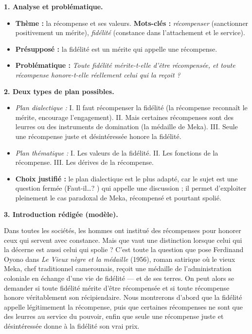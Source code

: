 \documentclass[11pt]{article}
\newcommand{\cle}[1]{{\popxbold\color{popdark}#1}}
\begin{document}
\begin{corrige}
\textbf{1. Analyse et problématique.}
\begin{itemize}
\item \textbf{Thème :} la récompense et ses valeurs. \textbf{Mots-clés :} \emph{récompenser} (sanctionner positivement un mérite), \emph{fidélité} (constance dans l'attachement et le service).
\item \textbf{Présupposé :} la fidélité est un mérite qui appelle une récompense.
\item \textbf{Problématique :} \emph{Toute fidélité mérite-t-elle d'être récompensée, et toute récompense honore-t-elle réellement celui qui la reçoit ?}
\end{itemize}

\textbf{2. Deux types de plan possibles.}
\begin{itemize}
\item \emph{Plan dialectique :} I. Il faut récompenser la fidélité (la récompense reconnaît le mérite, encourage l'engagement). II. Mais certaines récompenses sont des leurres ou des instruments de domination (la médaille de Meka). III. Seule une récompense juste et désintéressée honore la fidélité.
\item \emph{Plan thématique :} I. Les valeurs de la fidélité. II. Les fonctions de la récompense. III. Les dérives de la récompense.
\item \textbf{Choix justifié :} le plan \cle{dialectique} est le plus adapté, car le sujet est une question fermée (\og Faut-il\ldots ? \fg{}) qui appelle une discussion ; il permet d'exploiter pleinement le cas paradoxal de Meka, récompensé et pourtant spolié.
\end{itemize}

\textbf{3. Introduction rédigée (modèle).}

\og Dans toutes les sociétés, les hommes ont institué des récompenses pour honorer ceux qui servent avec constance. Mais que vaut une distinction lorsque celui qui la décerne est aussi celui qui spolie ? C'est toute la question que pose Ferdinand Oyono dans \emph{Le Vieux nègre et la médaille} (1956), roman satirique où le vieux Meka, chef traditionnel camerounais, reçoit une médaille de l'administration coloniale en échange d'une vie de fidélité — et de ses terres. On peut alors se demander si toute fidélité mérite d'être récompensée et si toute récompense honore véritablement son récipiendaire. Nous montrerons d'abord que la fidélité appelle légitimement la récompense, puis que certaines récompenses ne sont que des leurres au service du pouvoir, enfin que seule une récompense juste et désintéressée donne à la fidélité son vrai prix. \fg{}


\end{corrige}
\end{document}
